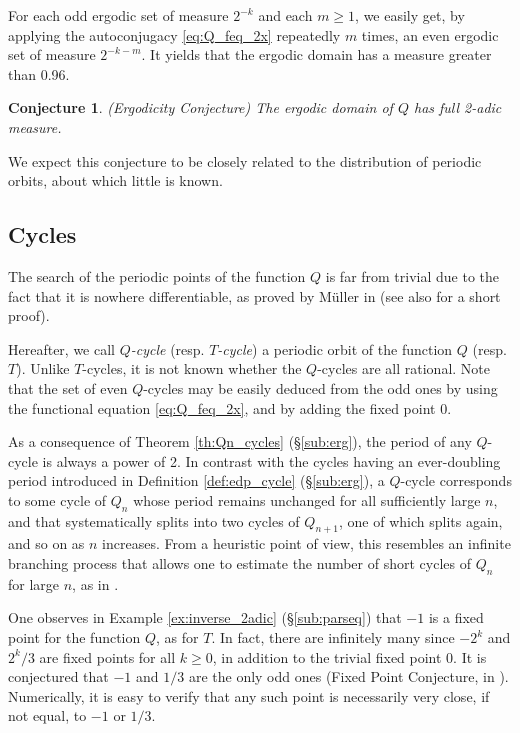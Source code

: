 \documentclass[12pt]{article}
\newtheorem{conjecture}{Conjecture}
\theoremstyle{definition}
\begin{document}
{For each odd ergodic set of measure $2^{-k}$ and each $m \geq 1$, we easily get, by applying the autoconjugacy \eqref{eq:Q_feq_2x} repeatedly $m$ times, an even ergodic set of measure $2^{-k-m}$. It yields that the ergodic domain has a measure greater than 0.96.

\begin{conjecture} {\em (Ergodicity Conjecture)}
The ergodic domain of $Q$ has full 2-adic measure.
\end{conjecture}

We expect this conjecture to be closely related to the distribution of periodic orbits, about which little is known.

\subsection{Cycles}
\label{sub:cycles}

The search of the periodic points of the function $Q$ is far from trivial due to the fact that it is nowhere differentiable, as proved by M\"uller in \cite{Mul91} (see also \cite{Ber94} for a short proof).

Hereafter, we call \emph{$Q$-cycle} (resp. \emph{$T$-cycle}) a periodic  orbit of the function $Q$ (resp. $T$). Unlike $T$-cycles, it is not known whether the $Q$-cycles are all rational. Note that the set of even $Q$-cycles may be easily deduced from the odd ones by using  the functional equation \eqref{eq:Q_feq_2x}, and by adding the fixed point $0$. 

As a consequence of Theorem \ref{th:Qn_cycles} (\S\ref{sub:erg}), the period of any $Q$-cycle is always a power of 2. In contrast with the cycles having an ever-doubling period introduced in Definition \ref{def:edp_cycle} (\S\ref{sub:erg}), a $Q$-cycle corresponds to some cycle of $Q_n$ whose period remains unchanged for all sufficiently large $n$, and that systematically splits into two  cycles of $Q_{n+1}$, one of which splits again, and so on as $n$ increases. From a heuristic point of view, this resembles an infinite branching process that allows one to estimate the number of short cycles of $Q_n$ for large $n$, as in \cite[\S 6]{Ber96}.

One observes in Example \ref{ex:inverse_2adic} (\S\ref{sub:parseq}) that $-1$ is a fixed point for the function $Q$, as for $T$. In fact, there are infinitely many since $-2^{k}$ and $2^{k}/3$ are fixed points for all $k \geq 0$, in addition to the trivial fixed point 0. It is conjectured  that $-1$ and $1/3$ are the only odd ones (Fixed Point Conjecture, in \cite{Ber96}). Numerically, it is easy to verify that any such point is necessarily very close, if not equal, to $-1$ or $1/3$.

}
\end{document}
